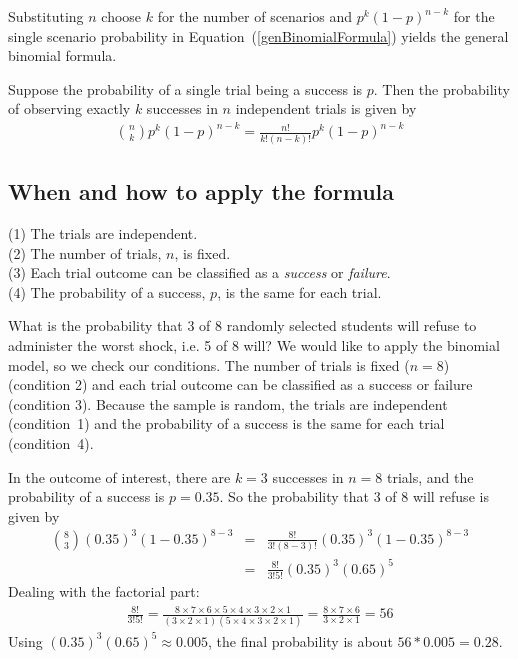 Substituting $n$ choose $k$ for the number of scenarios and $p^k(1-p)^{n-k}$ for the single scenario probability in Equation~(\ref{genBinomialFormula}) yields the general binomial formula.


\begin{termBox}{ Suppose the probability of a single trial being a success is $p$. Then the probability of observing exactly $k$ successes in $n$ independent trials is given by\vspace{-1mm}
\begin{eqnarray}
{n\choose k}p^k(1-p)^{n-k} = \frac{n!}{k!(n-k)!}p^k(1-p)^{n-k}
\label{binomialFormula}
\end{eqnarray}
}
\end{termBox}

\subsection{When and how to apply the formula}

\begin{tipBox}{
(1) The trials are independent. \\
(2) The number of trials, $n$, is fixed. \\
(3) Each trial outcome can be classified as a \emph{success} or \emph{failure}. \\
(4) The probability of a success, $p$, is the same for each trial.}
\end{tipBox}

\begin{example}{What is the probability that 3 of 8 randomly selected students will refuse to administer the worst shock, i.e. 5 of 8 will?}
We would like to apply the binomial model, so we check our conditions. The number of trials is fixed ($n=8$) (condition 2) and each trial outcome can be classified as a success or failure (condition 3). Because the sample is random, the trials are independent (condition~1) and the probability of a success is the same for each trial (condition~4).

In the outcome of interest, there are $k=3$ successes in $n=8$ trials, and the probability of a success is $p=0.35$. So the probability that 3 of 8 will refuse is given by
\begin{eqnarray*}
{ 8 \choose 3}(0.35)^3(1-0.35)^{8-3}
	&=& \frac{8!}{3!(8-3)!}(0.35)^3(1-0.35)^{8-3} \\
	&=& \frac{8!}{3!5!}(0.35)^3(0.65)^5
\end{eqnarray*}
Dealing with the factorial part:
\begin{eqnarray*}
\frac{8!}{3!5!} = \frac{8\times7\times6\times5\times4\times3\times2\times1}{(3\times2\times1)(5\times4\times3\times2\times1)} = \frac{8\times7\times6}{3\times2\times1} = 56
\end{eqnarray*}
Using $(0.35)^3(0.65)^5 \approx 0.005$, the final probability is about $56*0.005 = 0.28$.
\end{example}

